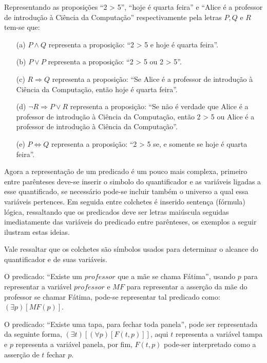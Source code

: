 \begin{example}
	Representando as proposições ``2 > 5'', ``hoje é quarta feira'' e ``Alice é a professor de introdução à Ciência da Computação'' respectivamente pela letras $P, Q$ e $R$ tem-se que:
	\begin{itemize}
		\item[(a)] $P \land Q$ representa a proposição: ``2 > 5 e hoje é quarta feira''.
		\item[(b)] $P \lor P$ representa a proposição: ``2 > 5 ou 2 > 5''.
		\item[(c)] $R \Rightarrow Q$ representa a proposição: ``Se Alice é a professor de introdução à Ciência da Computação, então hoje é quarta feira''.
		\item[(d)] $\neg R \Rightarrow  P \lor R$ representa a proposição: ``Se não é verdade que Alice é a professor de introdução à Ciência da Computação, então 2 > 5 ou  Alice é a professor de introdução à Ciência da Computação''.
		\item[(e)] $P \Leftrightarrow Q$ representa a proposição: ``2 > 5 se, e somente se hoje é quarta feira''.
	\end{itemize}
\end{example}

Agora a representação de um predicado é um pouco mais complexa, primeiro entre parênteses deve-se inserir o simbolo do quantificador e as variáveis ligadas a esse quantificado, se necessário pode-se incluir também o universo a qual essa variáveis pertences. Em seguida entre colchetes é inserido sentença (fórmula) lógica, ressaltando que os predicados deve ser letras maiúscula seguidas imediatamente das variáveis do predicado entre parênteses, os exemplos a seguir ilustram estas ideias.

\begin{remark}
	Vale ressaltar que os colchetes são símbolos usados para determinar o alcance do quantificador e de suas variáveis.
\end{remark}

\begin{example}
	O predicado: ``Existe um $professor$ que a mãe se chama Fátima'', usando $p$ para representar a variável $professor$ e $MF$ para representar a asserção da mãe do professor se chamar Fátima, pode-se representar tal predicado como: $(\exists p)[MF(p)]$.
\end{example}

\begin{example}
	O predicado: ``Existe uma tapa, para fechar toda panela'', pode ser representada da seguinte forma, $(\exists t)[(\forall p)[F(t, p)]]$, aqui $t$ representa a variável tampa e $p$ representa a variável panela, por fim, $F(t,p)$ pode-ser interpretado como a asserção de $t$ fechar $p$.
\end{example}

